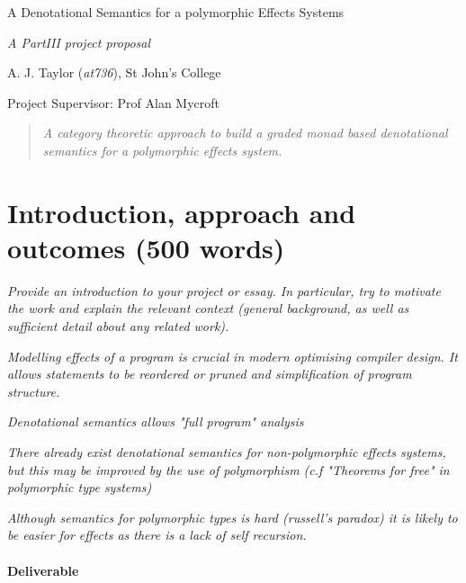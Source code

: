 \documentclass[11pt]{article}
\newcommand\comment[1]{}
\begin{document}
\centerline{\Large A Denotational Semantics for a polymorphic Effects Systems}
\vspace{2em}
\centerline{\Large \emph{A PartIII project proposal}}
\vspace{2em}
\centerline{\large A. J. Taylor (\emph{at736}), St John's College}
\vspace{1em}
\centerline{\large Project Supervisor: Prof Alan Mycroft}
\vspace{1em}

\begin{abstract}
\textsl{
	A category theoretic approach to build a graded monad based denotational semantics for a polymorphic effects system.
} 
\end{abstract}

\section{Introduction, approach and outcomes (500 words)}

\textsl{Provide an introduction to your project or essay. In particular, try to
  motivate the work and explain the relevant context (general
  background, as well as sufficient detail about any related
  work).}

\textsl{
Modelling effects of a program is crucial in modern optimising compiler design. It allows statements to be reordered or pruned and simplification of program structure.
}

\textsl{
Denotational semantics allows "full program" analysis
}

\textsl{
There already exist denotational semantics for non-polymorphic effects systems, but this may be improved by the use of polymorphism (c.f "Theorems for free" in polymorphic type systems)
}

\textsl{
Although semantics for polymorphic types is hard (russell's paradox) it is likely to be easier for effects as there is a lack of self recursion.
}


\paragraph{Deliverable}{

}

\comment {
What's the basic idea and approach? What are you thinking of  doing, and how is it going to solve the problem (or need) you've  identified. What are you going to ``produce''?  A project will typically produce one (or perhaps more) of the following: a piece of software, an evaluation of a published result, a proof, or the design (and perhaps the construction of) a new piece of hardware. An essay will typically either review and critique a particular area of the academic literature, or evaluate a published result or proof. Try to  name the specific things (and describe them) in this part of the  proposal -- this will allow you to refer to them in the next.} 
\end{document}
